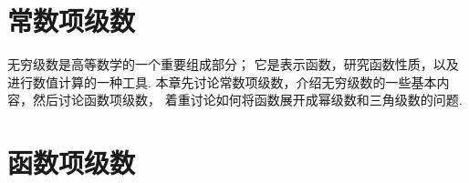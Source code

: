 







% 


\chapter{常数项级数}
无穷级数是高等数学的一个重要组成部分；
它是表示函数，研究函数性质，以及进行数值计算的一种工具.
本章先讨论常数项级数，介绍无穷级数的一些基本内容，然后讨论函数项级数，
着重讨论如何将函数展开成幂级数和三角级数的问题.









\chapter{函数项级数}












